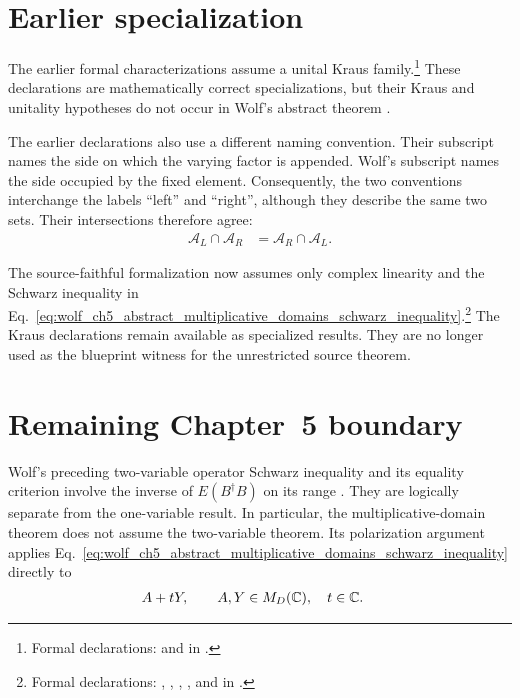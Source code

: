 \documentclass{article}
\begin{document}
\section{Earlier specialization}

The earlier formal characterizations assume a unital Kraus family.\footnote{
Formal declarations:
 and
 in
.}
These declarations are mathematically correct specializations, but their Kraus
and unitality hypotheses do not occur in Wolf's abstract theorem
\cite[Chapter~5, Equations~(5.11)--(5.14)]{Wolf2012Quantum}.

The earlier declarations also use a different naming convention. Their
subscript names the side on which the varying factor is appended. Wolf's
subscript names the side occupied by the fixed element. Consequently, the two
conventions interchange the labels ``left'' and ``right'', although they
describe the same two sets. Their intersections therefore agree:
\begin{align}
    \mathcal A_L\cap\mathcal A_R
        &=\mathcal A_R\cap\mathcal A_L.
    \label{eq:wolf_ch5_abstract_multiplicative_domains_full_domain_agreement}
\end{align}

The source-faithful formalization now assumes only complex linearity and the
Schwarz inequality in
Eq.~\ref{eq:wolf_ch5_abstract_multiplicative_domains_schwarz_inequality}.\footnote{
Formal declarations:
,
,
,
, and
 in
.}
The Kraus declarations remain available as specialized results. They are no
longer used as the blueprint witness for the unrestricted source theorem.

\section{Remaining Chapter~5 boundary}

Wolf's preceding two-variable operator Schwarz inequality and its equality
criterion involve the inverse of $E(B^\dagger B)$ on its range
\cite[Chapter~5, Theorem~5.3]{Wolf2012Quantum}. They are logically separate
from the one-variable result. In particular, the multiplicative-domain theorem
does not assume the two-variable theorem. Its polarization argument applies
Eq.~\ref{eq:wolf_ch5_abstract_multiplicative_domains_schwarz_inequality}
directly to
\begin{align}
    A+tY,
    \qquad
    A,Y&\in M_D(\mathbb{C}),
    \quad
    t\in\mathbb{C}.
    \label{eq:wolf_ch5_abstract_multiplicative_domains_polarization_input}
\end{align}
\end{document}
